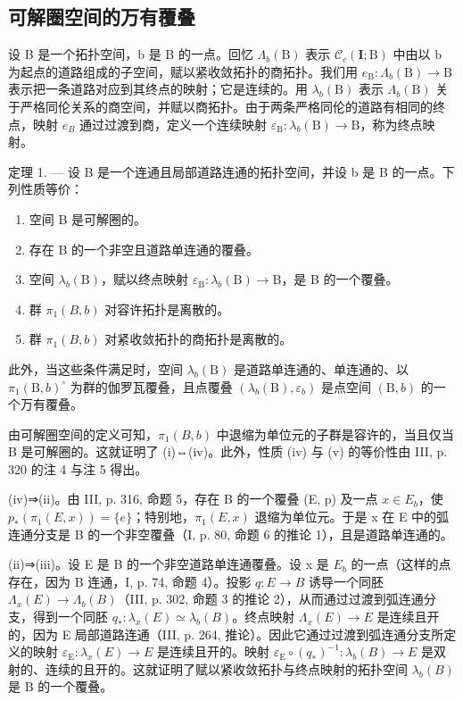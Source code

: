 \subsection{可解圈空间的万有覆叠}

设 B 是一个拓扑空间，b 是 B 的一点。回忆 \(\Lambda_{b}(\mathrm{B})\) 表示 \(\mathcal{C}_{c}(\mathbf{I};\mathrm{B})\) 中由以 b 为起点的道路组成的子空间，赋以紧收敛拓扑的商拓扑。我们用 \(e_{\mathrm{B}}\colon\Lambda_{b}(\mathrm{B})\to\mathrm{B}\) 表示把一条道路对应到其终点的映射；它是连续的。用 \(\lambda_{b}(\mathrm{B})\) 表示 \(\Lambda_{b}(\mathrm{B})\) 关于严格同伦关系的商空间，并赋以商拓扑。由于两条严格同伦的道路有相同的终点，映射 \(e_{B}\) 通过过渡到商，定义一个连续映射 \(\varepsilon_{\mathrm{B}}\colon\lambda_{b}(\mathrm{B})\to\mathrm{B}\)，称为终点映射。

定理 1. --- 设 B 是一个连通且局部道路连通的拓扑空间，并设 b 是 B 的一点。下列性质等价：

\begin{enumerate}
\def\labelenumi{(\roman{enumi})}
\item
  空间 B 是可解圈的。
\item
  存在 B 的一个非空且道路单连通的覆叠。
\item
  空间 \(\lambda_{b}(\mathrm{B})\)，赋以终点映射 \(\varepsilon_{\mathrm{B}}\colon\lambda_{b}(\mathrm{B})\to\mathrm{B}\)，是 B 的一个覆叠。
\item
  群 \(\pi_1(B, b)\) 对容许拓扑是离散的。
\item
  群 \(\pi_{1}(B,b)\) 对紧收敛拓扑的商拓扑是离散的。
\end{enumerate}

此外，当这些条件满足时，空间 \(\lambda_{b}(\mathrm{B})\) 是道路单连通的、单连通的、以 \(\pi_{1}(\mathrm{B},b)^{\circ}\) 为群的伽罗瓦覆叠，且点覆叠 \((\lambda_{b}(\mathrm{B}),\varepsilon_{b})\) 是点空间 \((\mathrm{B},b)\) 的一个万有覆叠。

由可解圈空间的定义可知，\(\pi_{1}(B,b)\) 中退缩为单位元的子群是容许的，当且仅当 B 是可解圈的。这就证明了 (i)⇔(iv)。此外，性质 (iv) 与 (v) 的等价性由 III, p. 320 的注 4 与注 5 得出。

(iv)⇒(ii)。由 III, p. 316, 命题 5，存在 B 的一个覆叠 (E, p) 及一点 \(x \in E_{b}\)，使 \(p_{*}(\pi_{1}(E, x)) = \{e\}\)；特别地，\(\pi_{1}(E, x)\) 退缩为单位元。于是 x 在 E 中的弧连通分支是 B 的一个非空覆叠（I, p. 80, 命题 6 的推论 1），且是道路单连通的。

(ii)⇒(iii)。设 E 是 B 的一个非空道路单连通覆叠。设 x 是 \(E_{b}\) 的一点（这样的点存在，因为 B 连通，I, p. 74, 命题 4）。投影 \(q: E \to B\) 诱导一个同胚 \(\Lambda_{x}(E) \to \Lambda_{b}(B)\)（III, p. 302, 命题 3 的推论 2），从而通过过渡到弧连通分支，得到一个同胚 \(q_{*}: \lambda_{x}(E) \simeq \lambda_{b}(B)\)。终点映射 \(\Lambda_{x}(E) \to E\) 是连续且开的，因为 E 局部道路连通（III, p. 264, 推论）。因此它通过过渡到弧连通分支所定义的映射 \(\varepsilon_{\mathrm{E}}: \lambda_{x}(E) \to E\) 是连续且开的。映射 \(\varepsilon_{\mathrm{E}} \circ (q_{*})^{-1}: \lambda_{b}(B) \to E\) 是双射的、连续的且开的。这就证明了赋以紧收敛拓扑与终点映射的拓扑空间 \(\lambda_{b}(B)\) 是 B 的一个覆叠。

